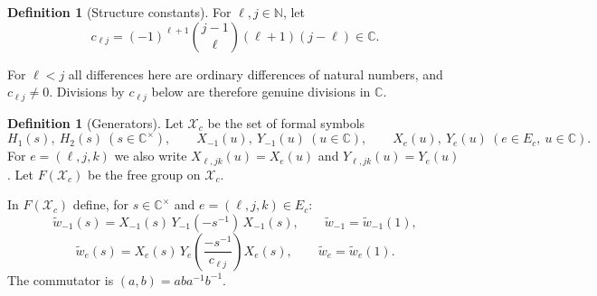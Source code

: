 \documentclass[11pt]{article}
\theoremstyle{definition}
\newtheorem{definition}[theorem]{Definition}
\theoremstyle{remark}
\begin{document}
\begin{definition}[Structure constants]
For $\ell,j\in\mathbb{N}$, let
\[
c_{\ell j}=(-1)^{\ell+1}\binom{j-1}{\ell}(\ell+1)(j-\ell)\in\mathbb{C}.
\]
\end{definition}

For $\ell<j$ all differences here are ordinary differences of natural numbers, and $c_{\ell j}\neq 0$. Divisions by $c_{\ell j}$ below are therefore genuine divisions in $\mathbb{C}$.

\begin{definition}[Generators]
Let $\mathcal{X}_c$ be the set of formal symbols
\[
H_1(s),\ H_2(s)\ (s\in\mathbb{C}^\times),\qquad X_{-1}(u),\ Y_{-1}(u)\ (u\in\mathbb{C}),\qquad X_e(u),\ Y_e(u)\ (e\in E_c,\ u\in\mathbb{C}).
\]
For $e=(\ell,j,k)$ we also write $X_{\ell,jk}(u)=X_e(u)$ and $Y_{\ell,jk}(u)=Y_e(u)$. Let $F(\mathcal{X}_c)$ be the free group on $\mathcal{X}_c$.

In $F(\mathcal{X}_c)$ define, for $s\in\mathbb{C}^\times$ and $e=(\ell,j,k)\in E_c$:
\[
\widetilde w_{-1}(s)=X_{-1}(s)\,Y_{-1}(-s^{-1})\,X_{-1}(s),\qquad \widetilde w_{-1}=\widetilde w_{-1}(1),
\]
\[
\widetilde w_e(s)=X_e(s)\,Y_e\!\left(\frac{-s^{-1}}{c_{\ell j}}\right)X_e(s),\qquad \widetilde w_e=\widetilde w_e(1).
\]
The commutator is $(a,b)=aba^{-1}b^{-1}$.
\end{definition}
\end{document}

